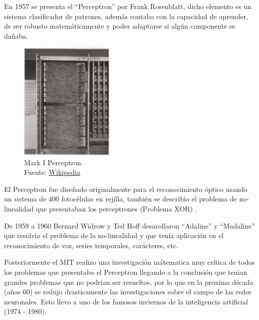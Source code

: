 En 1957 se presenta el ``Perceptron'' por {Frank Rosenblatt}, dicho elemento es un sistema clasificador de patrones, además contaba con la capacidad de aprender, de ser robusto matemáticamente y poder adaptarse si algún componente se dañaba.

\begin{figure}[H]
  \centering
  \includegraphics[width=0.4\textwidth]{figures/perceptron.png}
  \caption{Mark I Perceptron. \\Fuente: \href{https://en.wikipedia.org/wiki/Perceptron}{Wikipedia}}
  \label{fig:perceptron}
\end{figure}

El Perceptron fue diseñado originalmente para el reconocimiento óptico usando un sistema de 400 fotocélulas en rejilla, también se describio el problema de no-linealidad que presentaban los perceptrones (Problema XOR) \cite{cuevastello2018apuntes}.

De 1959 a 1960 {Bernard Widrow} y {Ted Hoff} desarollaron ``Adaline'' y ``Madaline'' \cite{widrow1960adaptive} que resolvia el problema de la no-linealidad y que tenía aplicación en el reconocimiento de voz, series temporales, carácteres, etc.

Posteriormente el MIT realizo una investigación mátematica muy crítica de todos los problemas que presentaba el Perceptron llegando a la conclusión que tenian grandes problemas que no podrian ser resueltos, por lo que en la proxima década (años 60) se redujo drasticamente las investigaciones sobre el campo de las redes neuronales.
Esto llevo a uno de los famosos inviernos de la inteligencia artificial (1974 - 1980).



